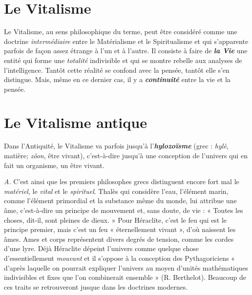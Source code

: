 \section{Le Vitalisme}%
Le Vitalisme, au sens philosophique du
terme, peut être considéré comme une doctrine {\it intermédiaire} entre
le Matérialisme et le Spiritualisme et qui s'apparente parfois de
façon assez étrange à l’un et à l’autre. Il consiste à faire de \textbf{\textit {la Vie}}
une entité qui forme une {\it totalité} indivisible et qui se montre rebelle
aux analyses de l'intelligence. Tantôt cette réalité se confond avec
la pensée, tantôt elle s’en distingue. Mais, même en ce dernier cas,
il y a \textbf{\textit {continuité}} entre la vie et la pensée.

\section{Le Vitalisme antique}%
Dans l'Antiquité, le Vitalisme
va parfois jusqu’à l’\textbf{\textit {hylozoïsme}} (grec : {\it hylè}, matière; {\it zôon}, être
vivant), c’est-à-dire jusqu’à une conception de l’univers qui en fait
un organisme, un être vivant.

\vspace{0.24cm}
{\footnotesize {\it A.} C'est ainsi que les premiers philosophes grecs distinguent encore
fort mal le {\it matériel}, le {\it vital} et le {\it spirituel}. Thalès qui considère l’eau,
l'élément marin, comme l’élément primordial et la substance même du
monde, lui attribue une âme, c’est-à-dire un principe de mouvement et,
sans doute, de vie : « Toutes les choses, dit-il, sont pleines de dieux. » Pour
Héraclite, c'est le feu qui est le principe premier, mais c’est un feu
« éternellement vivant », d'où naissent les âmes. Ames et corps représentent
divers degrés de tension, comme les cordes d’une lyre. Déjà Héraclite dépeint
l’univers comme quelque chose d’essentiellement {\it mouvant} et il s'oppose
à la conception des Pythagoriciens « d’après laquelle on pourrait expliquer
l’univers au moyen d'unités mathématiques indivisibles et fixes que
l'on combinerait ensemble » (R. Berthelot). Beaucoup de ces traits se
retrouveront jusque dans les doctrines modernes.}
\vspace{0.31cm}

